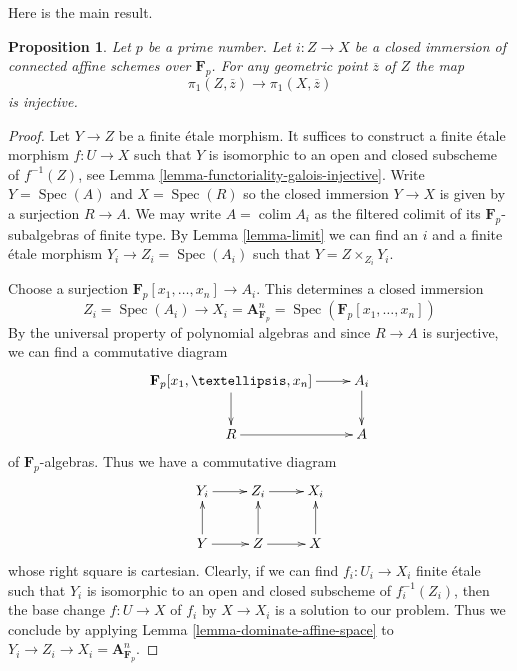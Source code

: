 \documentclass{stacks-project}
\theoremstyle{plain}
\newtheorem{proposition}[subsection]{Proposition}
\theoremstyle{definition}
\theoremstyle{remark}
\numberwithin{equation}{subsection}
\def\colim{\mathop{\mathrm{colim}}\nolimits}
\def\Spec{\mathop{\mathrm{Spec}}}
\begin{document}
\noindent
Here is the main result.

\begin{proposition}
\label{proposition-injective}
Let $p$ be a prime number. Let $i : Z \to X$ be a closed immersion
of connected affine schemes over $\mathbf{F}_p$. For any geometric
point $\overline{z}$ of $Z$ the map
$$
\pi_1(Z, \overline{z}) \to \pi_1(X, \overline{z})
$$
is injective.
\end{proposition}

\begin{proof}
Let $Y \to Z$ be a finite \'etale morphism. It suffices to construct
a finite \'etale morphism $f : U \to X$ such that $Y$ is isomorphic to
an open and closed subscheme of $f^{-1}(Z)$, see
Lemma \ref{lemma-functoriality-galois-injective}.
Write $Y = \Spec(A)$ and $X = \Spec(R)$ so the closed immersion
$Y \to X$ is given by a surjection $R \to A$. We may write
$A = \colim A_i$ as the filtered colimit of its $\mathbf{F}_p$-subalgebras
of finite type. By Lemma \ref{lemma-limit}
we can find an $i$ and a finite \'etale morphism $Y_i \to Z_i = \Spec(A_i)$
such that $Y = Z \times_{Z_i} Y_i$.

\medskip\noindent
Choose a surjection $\mathbf{F}_p[x_1, \ldots, x_n] \to A_i$.
This determines a closed immersion
$$
Z_i = \Spec(A_i)
\longrightarrow
X_i = \mathbf{A}^n_{\mathbf{F}_p} = \Spec(\mathbf{F}_p[x_1, \ldots, x_n])
$$
By the universal property of polynomial algebras and since
$R \to A$ is surjective, we can find a commutative diagram
$$
\xymatrix{
\mathbf{F}_p[x_1, \ldots, x_n] \ar[r] \ar[d] &
A_i \ar[d] \\
R \ar[r] &
A
}
$$
of $\mathbf{F}_p$-algebras. Thus we have a commutative diagram
$$
\xymatrix{
Y_i \ar[r] &
Z_i \ar[r] &
X_i \\
Y \ar[u] \ar[r] &
Z \ar[u] \ar[r] &
X \ar[u]
}
$$
whose right square is cartesian. Clearly, if we can
find $f_i : U_i \to X_i$ finite \'etale such that $Y_i$ is
isomorphic to an open and closed subscheme of $f_i^{-1}(Z_i)$,
then the base change $f : U \to X$ of $f_i$ by $X \to X_i$
is a solution to our problem. Thus we conclude by applying
Lemma \ref{lemma-dominate-affine-space} to
$Y_i \to Z_i \to X_i = \mathbf{A}^n_{\mathbf{F}_p}$.
\end{proof}















\end{document}
